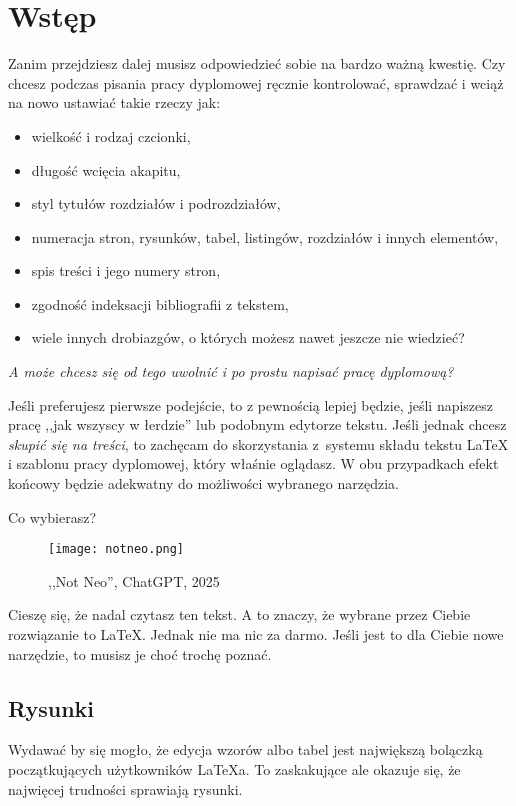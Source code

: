 \chapter{Wstęp}
\label{ch:wstep}

Zanim przejdziesz dalej musisz odpowiedzieć sobie na bardzo ważną kwestię. Czy chcesz podczas pisania pracy dyplomowej ręcznie kontrolować, sprawdzać i wciąż na nowo ustawiać takie rzeczy jak:

\begin{itemize}
	\item wielkość i rodzaj czcionki,
	\item długość wcięcia akapitu,
	\item styl tytułów rozdziałów i podrozdziałów,
	\item numeracja stron, rysunków, tabel, listingów, rozdziałów i innych elementów,
	\item spis treści i jego numery stron,
	\item zgodność indeksacji bibliografii z tekstem,
	\item wiele innych drobiazgów, o których możesz nawet jeszcze nie wiedzieć?
\end{itemize}

\textit{A może chcesz się od tego uwolnić i po prostu napisać pracę dyplomową?}

Jeśli preferujesz pierwsze podejście, to z pewnością lepiej będzie, jeśli napiszesz pracę ,,jak wszyscy w łerdzie'' lub podobnym edytorze tekstu. Jeśli jednak chcesz \textit{skupić się na treści}, to zachęcam do skorzystania z~systemu składu tekstu \LaTeX{} i szablonu pracy dyplomowej, który właśnie oglądasz. W obu przypadkach efekt końcowy będzie adekwatny do możliwości wybranego narzędzia.

Co wybierasz?

\begin{figure}[!htbp]
	\centering \texttt{[image: notneo.png]} %
	\caption{,,Not Neo'', ChatGPT, 2025}
	\label{rys:notneo}
\end{figure}

Cieszę się, że nadal czytasz ten tekst. A to znaczy, że wybrane przez Ciebie rozwiązanie to \LaTeX. Jednak nie ma nic za darmo. Jeśli jest to dla Ciebie nowe narzędzie, to musisz je choć trochę poznać.

\section{Rysunki}
Wydawać by się mogło, że edycja wzorów albo tabel jest największą bolączką początkujących użytkowników \LaTeX{a}. To zaskakujące ale okazuje się, że najwięcej trudności sprawiają rysunki.

